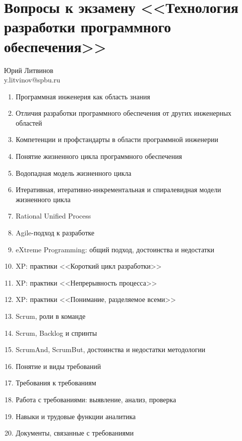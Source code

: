 \documentclass[a5paper]{article}
\begin{document}
\thispagestyle{empty}

\section*{Вопросы к экзамену <<Технология разработки программного обеспечения>>}

\begin{flushright}\begin{small}Юрий Литвинов\\\small{y.litvinov@spbu.ru}\end{small}\end{flushright}

\begin{enumerate}
    \item Программная инженерия как область знания
    \item Отличия разработки программного обеспечения от других инженерных областей
    \item Компетенции и профстандарты в области программной инженерии
    \item Понятие жизненного цикла программного обеспечения
    \item Водопадная модель жизненного цикла
    \item Итеративная, итеративно-инкрементальная и спиралевидная модели жизненного цикла
    \item Rational Unified Process
    \item Agile-подход к разработке
    \item eXtreme Programming: общий подход, достоинства и недостатки
    \item XP: практики <<Короткий цикл разработки>>
    \item XP: практики <<Непрерывность процесса>>
    \item XP: практики <<Понимание, разделяемое всеми>>
    \item Scrum, роли в команде
    \item Scrum, Backlog и спринты
    \item ScrumAnd, ScrumBut, достоинства и недостатки методологии
    \item Понятие и виды требований
    \item Требования к требованиям
    \item Работа с требованиями: выявление, анализ, проверка
    \item Навыки и трудовые функции аналитика
    \item Документы, связанные с требованиями

\end{enumerate}
\end{document}
